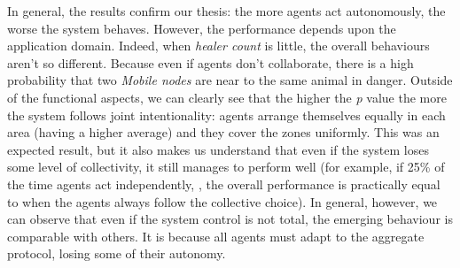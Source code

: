 In general, the results confirm our thesis: 
 the more agents act autonomously, the worse the system behaves. 
 However, the performance depends upon the application domain. 
 Indeed, when \emph{healer count} is little, the overall behaviours aren't so different. 
 Because even if agents don't collaborate, there is a high probability that two \emph{Mobile nodes}
 are near to the same animal in danger.
%
%
Outside of the functional aspects, we can clearly see that the higher the \emph{p} value 
 the more the system follows joint intentionality: agents arrange themselves equally in each area (having a higher average)
 and they cover the zones uniformly.
%
This was an expected result, but it also makes us understand that even if the system 
 loses some level of collectivity, it still manages to perform well 
 (for example, if 25\% of the time agents act independently, , 
 the overall performance is practically equal to when the agents 
 always follow the collective choice).
%
In general, however, we can observe that even if the system control is not total,
 the emerging behaviour is comparable with others.
%
It is because all agents must adapt to the aggregate protocol, losing some of their autonomy.
